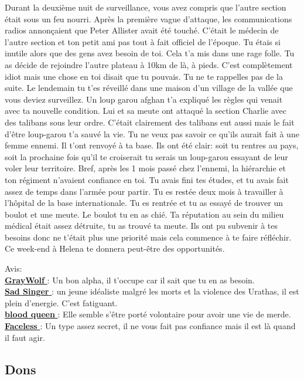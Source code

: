 \documentclass[oneside,12pt]{book}
\newcommand{\Glen}{\textbf{GrayWolf} }
\newcommand{\Mathew}{\textbf{Sad Singer} }
\newcommand{\Laura}{\textbf{blood queen} }
\newcommand{\Andy}{\textbf{Faceless} }
\begin{document}
\begin{flushleft}
\begin{description}
{Durant la deuxième nuit de surveillance, vous avez compris que l'autre section était sous un feu nourri. Après la première vague d'attaque, les communications radios annonçaient que Peter Allister avait été touché.
C'était le médecin de l'autre section et ton petit ami pas tout à fait officiel de l'époque. Tu étais si inutile alors que des gens avez besoin de toi. Cela t'a mis dans une rage folle. Tu as décide de rejoindre l'autre plateau à 10km de là, à pieds. C'est complètement idiot mais une chose en toi disait que tu pouvais. Tu ne te rappelles pas de la suite.
Le lendemain tu t'es réveillé dans une maison d'un village de la vallée que vous deviez surveillez. Un loup garou afghan t'a expliqué les règles qui venait avec ta nouvelle condition.
Lui et sa meute ont attaqué la section Charlie avec des talibans sous leur ordre. C'était clairement des talibans eut aussi mais le fait d'être loup-garou t'a sauvé la vie. Tu ne veux pas savoir ce qu'ils aurait fait à une femme ennemi.
Il t'ont renvoyé à ta base. Ils ont été clair: soit tu rentres au pays, soit la prochaine fois qu'il te croiserait tu serais un loup-garou essayant de leur voler leur territoire. Bref, après les 1 mois passé chez l'ennemi, la hiérarchie et ton régiment n'avaient confiance en toi. Tu avais fini tes études, et tu avais fait assez de temps dans l'armée pour partir.
Tu es restée deux mois à travailler à l'hôpital de la base internationale.
Tu es rentrée et tu as essayé de trouver un boulot et une meute. Le boulot tu en as chié. Ta réputation au sein du milieu médical était assez détruite, tu as trouvé ta meute. Ils ont pu subvenir à tes besoins donc ne t'était plus une priorité mais cela commence à te faire réfléchir.
Ce week-end à Helena te donnera peut-être des opportunités.

Avis:\\
\underline{\Glen} : Un bon alpha, il t'occupe car il sait que tu en as besoin. \\
\underline{\Mathew} : un jeune idéaliste malgré les morts et la violence des Urathas, il est plein d'energie. C'est fatiguant. \\
\underline{\Laura} : Elle semble s'être porté volontaire pour avoir une vie de merde. \\
\underline{\Andy}: Un type assez secret, il ne vous fait pas confiance mais il est là quand il faut agir. \\
}
\end{description}
\clearpage
\subsection*{Dons}


\end{flushleft}
\end{document}
